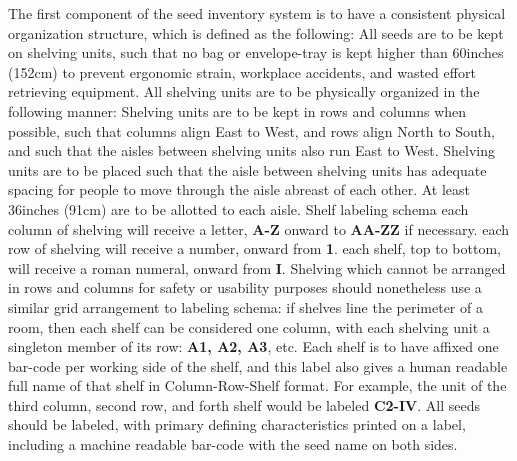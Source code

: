 \documentclass[12pt, letterpaper,oneocolumn]{article}
\begin{document}
	\begin{outline}[enumerate]
	\0 The first component of the seed inventory system is to have a consistent physical organization structure, which is defined as the following:
		\1 All seeds are to be kept on shelving units, such that no bag or envelope-tray is kept higher than 60inches (152cm) to prevent ergonomic strain, workplace accidents, and wasted effort retrieving equipment.
		\1 All shelving units are to be physically organized in the following manner:
			\2 Shelving units are to be kept in rows and columns when possible, such that columns align East to West, and rows align North to South, and such that the aisles between shelving units also run East to West.
			\2 Shelving units are to be placed such that the aisle between shelving units has adequate spacing for people to move through the aisle abreast of each other. At least 36inches (91cm) are to be allotted to each aisle.
			\2 Shelf labeling schema
				\3 each column of shelving will receive a letter, \textbf{A-Z} onward to \textbf{AA-ZZ} if necessary.
				\3 each row of shelving will receive a number, onward from \textbf{1}.
				\3 each shelf, top to bottom, will receive a roman numeral, onward from \textbf{I}.
		\1 Shelving which cannot be arranged in rows and columns for safety or usability purposes should nonetheless use a similar grid arrangement to labeling schema: if shelves line the perimeter of a room, then each shelf can be considered one column, with each shelving unit a singleton member of its row: \textbf{A1, A2, A3}, etc.
		\1 Each shelf is to have affixed one bar-code per working side of the shelf, and this label also gives a human readable full name of that shelf in Column-Row-Shelf format. For example, the unit of the third column, second row, and forth shelf would be labeled \textbf{C2-IV}.
		\1 All seeds should be labeled, with primary defining characteristics printed on a label, including a machine readable bar-code with the seed name on both sides.
	\end{outline}
\end{document}
